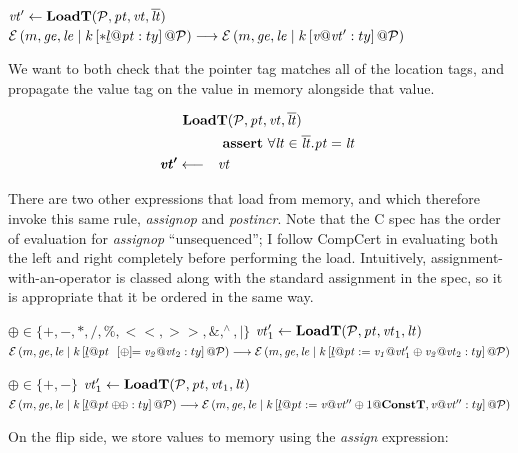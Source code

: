 \documentclass{article}
\begin{document}
            {\(\mathit{vt}' \leftarrow \mathbf{LoadT}(\mathcal{P},\mathit{pt},\mathit{vt},\overline{\mathit{lt}})\)}
            {\(\mathcal{E}\left(m,\mathit{ge},\mathit{le} \mid k \left[* \underline{l}@\mathit{pt} : ty\right] @ \mathcal{P}\right)
              \longrightarrow
              \mathcal{E}\left(m,\mathit{ge},\mathit{le} \mid k \left[\mathit{v} @ \mathit{vt}' : ty\right] @ \mathcal{P}\right)\)}

We want to both check that the pointer tag matches all of the location tags, and propagate the
value tag on the value in memory alongside that value.

\[\begin{aligned}
\truledef{\loadt{\PCT}{\pt}{\vt}{\overline{\lt}}}
\assert{\forall \lt \in \overline{\lt} . \pt = \lt}
\settag{\vt'}{\vt}
\end{aligned}\]

There are two other expressions that load from memory, and which therefore invoke
this same rule, {\it assignop} and {\it postincr}. Note that the C spec has the order
of evaluation for {\it assignop} ``unsequenced''; I follow CompCert in evaluating both the left
and right completely before performing the load. Intuitively, assignment-with-an-operator is
classed along with the standard assignment in the spec, so it is appropriate that it be ordered
in the same way.

              {\(\oplus \in \{+,-,*,/,\%,<<,>>,\&,^\wedge,|\}\)}
              {\(\mathit{vt}_1' \leftarrow \mathbf{LoadT}(\mathcal{P},\mathit{pt},\mathit{vt}_1,\mathit{lt})\)}
              {\(\mathcal{E}\left(m,\mathit{ge},\mathit{le} \mid k \left[\underline{l}@\mathit{pt} ~~ [\oplus]\!\!= \mathit{v_2} @ \mathit{vt}_2 : ty\right] @ \mathcal{P}\right)
                \longrightarrow
                \mathcal{E}\left(m,\mathit{ge},\mathit{le} \mid k \left[\underline{l}@\mathit{pt} := \mathit{v_1} @ \mathit{vt}_1' \oplus \mathit{v_2} @ \mathit{vt}_2 : ty\right] @ \mathcal{P}\right)\)}

              {\(\oplus \in \{+,-\}\)}
              {\(\mathit{vt}_1' \leftarrow \mathbf{LoadT}(\mathcal{P},\mathit{pt},\mathit{vt}_1,\mathit{lt})\)}
              {\(\mathcal{E}\left(m,\mathit{ge},\mathit{le} \mid k \left[\underline{l}@\mathit{pt} \oplus\!\!\oplus : ty\right] @ \mathcal{P}\right)
                \longrightarrow
                \mathcal{E}\left(m,\mathit{ge},\mathit{le} \mid k \left[\underline{l}@\mathit{pt} := \mathit{v} @ \mathit{vt}'' \oplus 1@\mathbf{ConstT}, \mathit{v} @ \mathit{vt}'' : ty\right] @ \mathcal{P}\right)\)}

On the flip side, we store values to memory using the {\it assign} expression:
\end{document}

